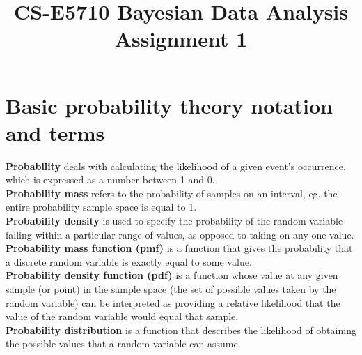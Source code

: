 \documentclass{article}
\begin{document}
\title{CS-E5710 Bayesian Data Analysis\\Assignment 1}                  
\maketitle



\section{Basic probability theory notation and terms}

\textbf{Probability} deals with calculating the likelihood of a given event's occurrence, which is expressed as a number between 1 and 0.\\

\textbf{Probability mass} refers to the probability of samples on an interval, eg. the entire probability sample space is equal to 1.\\

\textbf{Probability density} is used to specify the probability of the random variable falling within a particular range of values, as opposed to taking on any one value.\\

\textbf{Probability mass function (pmf)} is a function that gives the probability that a discrete random variable is exactly equal to some value.\\

\textbf{Probability density function (pdf)} is a function whose value at any given sample (or point) in the sample space (the set of possible values taken by the random variable) can be interpreted as providing a relative likelihood that the value of the random variable would equal that sample.\\

\textbf{Probability distribution} is a function that describes the likelihood of obtaining the possible values that a random variable can assume.\\
\end{document}
